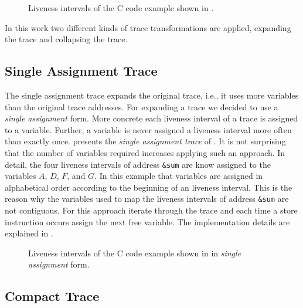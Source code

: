 \documentclass[onecolumn, openright, master, english, signatures]{dbrgrptt}
\begin{document}
\begin{figure}[!ht]
  \centering
  
  \caption{Liveness intervals of the C code example shown in .}
  \label{fig:trace-transformation-original}
\end{figure}

In this work two different kinds of \ac{trace} transformations are applied, expanding the \ac{trace} and collapsing the \ac{trace}.

\subsection{Single Assignment Trace}

The single assignment trace expands the original \ac{trace}, i.e., it uses more variables than the original \ac{trace} addresses.
For expanding a \ac{trace} we decided to use a \emph{single assignment} form.
More concrete each liveness interval of a \ac{trace} is assigned to a variable.
Further, a variable is never assigned a liveness interval more often than exactly once.
 presents the \emph{single assignment trace} of .
It is not surprising that the number of variables required increases applying such an approach.
In detail, the four liveness intervals of address \texttt{\&sum} are know assigned to the variables $A$, $D$, $F$, and $G$.
In this example that variables are assigned in alphabetical order according to the beginning of an liveness interval.
This is the reason why the variables used to map the liveness intervals of address \texttt{\&sum} are not contiguous.
For this approach iterate through the \ac{trace} and each time a store instruction occurs assign the next free variable.
The implementation details are explained in .

\begin{figure}[!ht]
  \centering
  
  \caption{Liveness intervals of the C code example shown in  in \emph{single assignment} form.}
  \label{fig:trace-transformation-sa}
\end{figure}

\subsection{Compact Trace}
\end{document}
